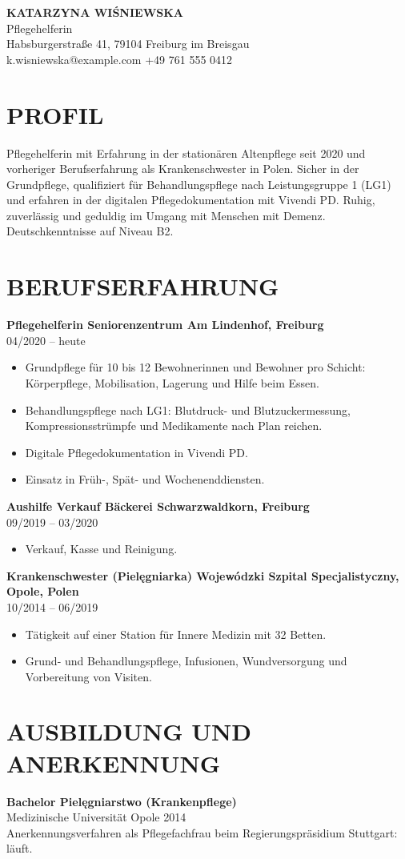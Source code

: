 \documentclass[11pt,a4paper]{article}
\newcommand{\cvsection}[1]{\section*{#1}}
\begin{document}
{\LARGE\bfseries\color{primarycolor} KATARZYNA WIŚNIEWSKA}\\[0.2em]
{\large\color{accentcolor} Pflegehelferin}\\[0.3em]
Habsburgerstraße 41, 79104 Freiburg im Breisgau\\
k.wisniewska@example.com \textbar{} +49 761 555 0412

\cvsection{PROFIL}
Pflegehelferin mit Erfahrung in der stationären Altenpflege seit 2020 und vorheriger Berufserfahrung als Krankenschwester in Polen. Sicher in der Grundpflege, qualifiziert für Behandlungspflege nach Leistungsgruppe 1 (LG1) und erfahren in der digitalen Pflegedokumentation mit Vivendi PD. Ruhig, zuverlässig und geduldig im Umgang mit Menschen mit Demenz. Deutschkenntnisse auf Niveau B2.

\cvsection{BERUFSERFAHRUNG}
\textbf{Pflegehelferin \textbar{} Seniorenzentrum Am Lindenhof, Freiburg}\\
04/2020 – heute
\begin{itemize}
\item Grundpflege für 10 bis 12 Bewohnerinnen und Bewohner pro Schicht: Körperpflege, Mobilisation, Lagerung und Hilfe beim Essen.
\item Behandlungspflege nach LG1: Blutdruck- und Blutzuckermessung, Kompressionsstrümpfe und Medikamente nach Plan reichen.
\item Digitale Pflegedokumentation in Vivendi PD.
\item Einsatz in Früh-, Spät- und Wochenenddiensten.
\end{itemize}
\smallskip
\textbf{Aushilfe Verkauf \textbar{} Bäckerei Schwarzwaldkorn, Freiburg}\\
09/2019 – 03/2020
\begin{itemize}
\item Verkauf, Kasse und Reinigung.
\end{itemize}
\smallskip
\textbf{Krankenschwester (Pielęgniarka) \textbar{} Wojewódzki Szpital Specjalistyczny, Opole, Polen}\\
10/2014 – 06/2019
\begin{itemize}
\item Tätigkeit auf einer Station für Innere Medizin mit 32 Betten.
\item Grund- und Behandlungspflege, Infusionen, Wundversorgung und Vorbereitung von Visiten.
\end{itemize}

\cvsection{AUSBILDUNG UND ANERKENNUNG}
\textbf{Bachelor Pielęgniarstwo (Krankenpflege)}\\
Medizinische Universität Opole \textbar{} 2014\\
Anerkennungsverfahren als Pflegefachfrau beim Regierungspräsidium Stuttgart: läuft.
\end{document}
